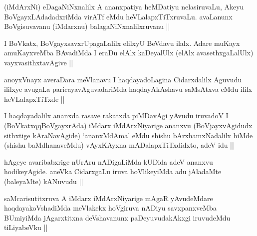 
\begin{artha}
(iMdArxNi) eDagaNiNxnalilx A ananxpatiya heMDatiyu nelasiruvaLu, Akeyu BoVgayxLAdadadxriMda virATf eMdu heVLalapxTiTxruvaLu. avaLanunx BoVgisuvavanu (iMdarxnu) balagaNiNxnalilxruvanu ||
\end{artha}


\begin{artha}
I BoVkatx, BoVgayxsavxrUpagaLalilx elilxyU BeVdavu ilalx. Adare muKayx amuKayxveMba BAvadiMda I eraDu elAlx kaDeyalUlx (elAlx avasethxgaLalUlx) vayxvasithxtavAgive ||
\end{artha}


\begin{artha}
anoyxVnayx averaDara meVlanavu I haqdayadoLagina Cidarxdalilx Aguvudu ililxye avugaLa paricayavAguvadariMda haqdayAkAshavu saMsAtxva eMdu ililx heVLalapxTiTxde ||
\end{artha}


\begin{artha}
I haqdayadalilx ananxda rasave rakatxda piMDavAgi yAvudu iruvadoV I (BoVkatxqqBoVgayxrAda) iMdarx iMdArxNiyarige ananxvu (BoVjayxvAgidudx sithxtige kAraNavAgide) `ananxMdAma' eMdu shishu bArxhamxNadalilx hiMde (shishu baMdhanaveMdu) vAyxKAyxna mADalapxTiTxdidxto, adeV idu ||
\end{artha}


\begin{artha}
hAgeye avaribabxrige nUrAru nADigaLiMda kUDida adeV ananxvu hodikeyAgide. aneVka CidarxgaLu iruva hoVlikeyiMda adu jAladaMte (baleyaMte) kANuvudu ||
\end{artha}


\begin{artha}
saMcarisutitxruva A iMdarx iMdArxNiyarige mAgaR yAvudeMdare haqdayakoVshadiMda meVlakekx hoVgiruva nADiyu savxpanxveMba BUmiyiMda jAgarxtitxna deVshavanunx paDeyuvudakAkxgi iruvudeMdu tiLiyabeVku ||
\end{artha}

